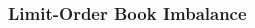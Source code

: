 \documentclass{beamer}
\newlength\figureheight
\newlength\figurewidth
\begin{document}
\begin{frame}
\frametitle{Limit-Order Book Imbalance}
\begin{columns}[T] %
\begin{column}{.48\textwidth}
\setlength\figureheight{\textwidth}%
\setlength\figurewidth{\textwidth}%
%

\end{column}%
\hfill%
\begin{column}{.48\textwidth}
\centering
\setlength\figureheight{\textwidth}%
\setlength\figurewidth{\textwidth}%
%

\end{column}%
\end{columns}
\end{frame}
\end{document}
